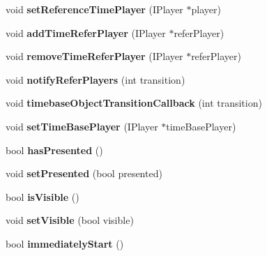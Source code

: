 \begin{CompactItemize}
\item 
void \textbf{setReferenceTimePlayer} (IPlayer $\ast$player)\label{classbr_1_1pucrio_1_1telemidia_1_1ginga_1_1ncl_1_1FormatterMediator_8ec8dbf3f66ae2602bba4d8c4530f428}

\item 
void \textbf{addTimeReferPlayer} (IPlayer $\ast$referPlayer)\label{classbr_1_1pucrio_1_1telemidia_1_1ginga_1_1ncl_1_1FormatterMediator_f80f231a29c2d3dd5ee3133aa0c45b53}

\item 
void \textbf{removeTimeReferPlayer} (IPlayer $\ast$referPlayer)\label{classbr_1_1pucrio_1_1telemidia_1_1ginga_1_1ncl_1_1FormatterMediator_76983c48a3038df4c8ecac18cabcbb62}

\item 
void \textbf{notifyReferPlayers} (int transition)\label{classbr_1_1pucrio_1_1telemidia_1_1ginga_1_1ncl_1_1FormatterMediator_00037986eb1ec8fe41cb7ae08c320356}

\item 
void \textbf{timebaseObjectTransitionCallback} (int transition)\label{classbr_1_1pucrio_1_1telemidia_1_1ginga_1_1ncl_1_1FormatterMediator_b785f5d683466e3449f0341d8d88e421}

\item 
void \textbf{setTimeBasePlayer} (IPlayer $\ast$timeBasePlayer)\label{classbr_1_1pucrio_1_1telemidia_1_1ginga_1_1ncl_1_1FormatterMediator_545c8a2b486383581f0f0ae6b8005d06}

\item 
bool \textbf{hasPresented} ()\label{classbr_1_1pucrio_1_1telemidia_1_1ginga_1_1ncl_1_1FormatterMediator_8f879283fa69a56be7e1d3b0fb013936}

\item 
void \textbf{setPresented} (bool presented)\label{classbr_1_1pucrio_1_1telemidia_1_1ginga_1_1ncl_1_1FormatterMediator_b37fc0ba6e5e9a3cc12e5d14fe2fbbb1}

\item 
bool \textbf{isVisible} ()\label{classbr_1_1pucrio_1_1telemidia_1_1ginga_1_1ncl_1_1FormatterMediator_adc2f7e6c414e3e7016fb654293daa7f}

\item 
void \textbf{setVisible} (bool visible)\label{classbr_1_1pucrio_1_1telemidia_1_1ginga_1_1ncl_1_1FormatterMediator_18e44e30b31525a243960ca3928125aa}

\item 
bool \textbf{immediatelyStart} ()\label{classbr_1_1pucrio_1_1telemidia_1_1ginga_1_1ncl_1_1FormatterMediator_7917e95acd599bf7fee86b238a51fae7}


\end{CompactItemize}
